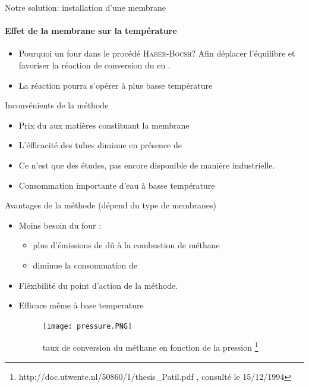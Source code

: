 \documentclass{beamer}
\begin{document}
\begin{frame}{Notre solution: installation d'une membrane}
\framesubtitle{Effet de la membrane sur la température}
\begin{itemize}
\item Pourquoi un four dans le procédé \textsc{Haber-Bocsh}? Afin déplacer l'équilibre et favoriser la réaction de conversion du  en .
\item La réaction pourra s'opérer à plus basse température
\end{itemize}

\end{frame}

\begin{frame}{Inconvénients de la méthode}
\begin{itemize}
\item Prix du aux matières constituant la membrane 
\item L'éfficacité des tubes diminue en présence de 
\item Ce n'est que des études, pas encore disponible de manière industrielle.
\item Consommation importante d'eau à basse température
\end{itemize}
\end{frame}

\begin{frame}{Avantages de la méthode (dépend du type de membranes)}
\begin{itemize}
\item Moins besoin du four : 
    \begin{itemize}
    \item plus d'émissions de  dû à la combustion de méthane
    \item diminue la consommation de 
    \end{itemize} 
\item Fléxibilité du point d'action de la méthode. 
\item Efficace même à base temperature
\begin{figure}[ht!]
 \centering
 \texttt{[image: pressure.PNG]}
 \caption{taux de conversion du méthane en fonction de la pression \footnote{http://doc.utwente.nl/50860/1/thesis_Patil.pdf
, consulté le 15/12/1994}}
\end{figure}
\end{itemize}
\end{frame}
\end{document}
